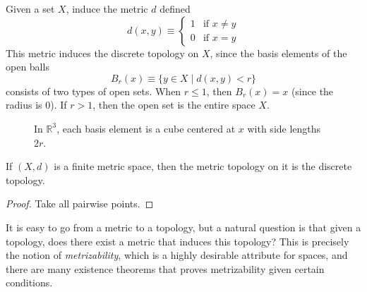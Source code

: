   \begin{example}
    Given a set $X$, induce the metric $d$ defined
    \begin{equation}
      d(x, y) \equiv \begin{cases} 1 & \text{if } x \neq y \\ 0 & \text{if } x = y \end{cases}
    \end{equation}
    This metric induces the discrete topology on $X$, since the basis elements of the open balls
    \begin{equation}
      B_r (x) \equiv \{ y \in X \mid d(x, y) <r\}
    \end{equation}
    consists of two types of open sets. When $r \leq 1$, then $B_r (x) = x$ (since the radius is $0$). If $r > 1$, then the open set is the entire space $X$. 
  \end{example} 

  \begin{example}
    \begin{figure}[H]
      \centering 
      \caption{In $\mathbb{R}^3$, each basis element is a cube centered at $x$ with side lengths $2r$.} 
      \label{fig:}
    \end{figure}
  \end{example}

  \begin{theorem}
    If $(X, d)$ is a finite metric space, then the metric topology on it is the discrete topology. 
  \end{theorem}
  \begin{proof}
    Take all pairwise points. 
  \end{proof}

  It is easy to go from a metric to a topology, but a natural question is that given a topology, does there exist a metric that induces this topology? This is precisely the notion of \textit{metrizability}, which is a highly desirable attribute for spaces, and there are many existence theorems that proves metrizability given certain conditions.

